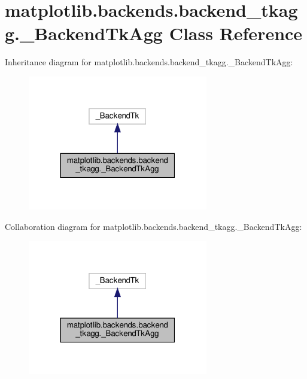 \hypertarget{classmatplotlib_1_1backends_1_1backend__tkagg_1_1__BackendTkAgg}{}\section{matplotlib.\+backends.\+backend\+\_\+tkagg.\+\_\+\+Backend\+Tk\+Agg Class Reference}
\label{classmatplotlib_1_1backends_1_1backend__tkagg_1_1__BackendTkAgg}


Inheritance diagram for matplotlib.\+backends.\+backend\+\_\+tkagg.\+\_\+\+Backend\+Tk\+Agg\+:
\nopagebreak
\begin{figure}[H]
\begin{center}
\leavevmode
\includegraphics[width=223pt]{classmatplotlib_1_1backends_1_1backend__tkagg_1_1__BackendTkAgg__inherit__graph}
\end{center}
\end{figure}


Collaboration diagram for matplotlib.\+backends.\+backend\+\_\+tkagg.\+\_\+\+Backend\+Tk\+Agg\+:
\nopagebreak
\begin{figure}[H]
\begin{center}
\leavevmode
\includegraphics[width=223pt]{classmatplotlib_1_1backends_1_1backend__tkagg_1_1__BackendTkAgg__coll__graph}
\end{center}
\end{figure}
